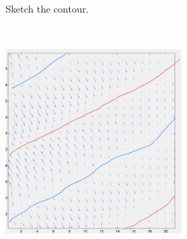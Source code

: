 Sketch the contour.

\begin{solution}\
\begin{center}
    \includegraphics[width=0.5\textwidth]{img/e4p2.png}
\end{center}
\end{solution}